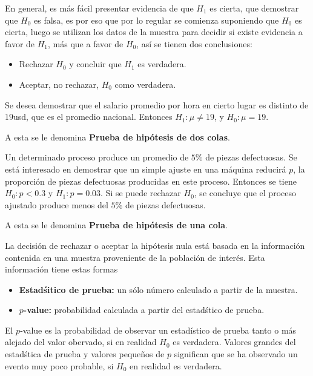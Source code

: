 En general, es m\'as f\'acil presentar evidencia de que $H_{1}$ es cierta, que demostrar 	que $H_{0}$ es falsa, es por eso que por lo regular se comienza suponiendo que $H_{0}$ es cierta, luego se utilizan los datos de la muestra para decidir si existe evidencia a favor de $H_{1}$, m\'as que a favor de $H_{0}$, as\'i se tienen dos conclusiones:
\begin{itemize}
\item Rechazar $H_{0}$ y concluir que $H_{1}$ es verdadera.
\item Aceptar, no rechazar, $H_{0}$ como verdadera.
\end{itemize}

\begin{Ejem}
Se desea demostrar que el salario promedio  por hora en cierto lugar es distinto de $19$usd, que es el promedio nacional. Entonces $H_{1}:\mu\neq19$, y $H_{0}:\mu=19$.
\end{Ejem}
A esta se le denomina \textbf{Prueba de hip\'otesis de dos colas}.

\begin{Ejem}
Un determinado proceso produce un promedio de $5\%$ de piezas defectuosas. Se est\'a interesado en demostrar que un simple ajuste en una m\'aquina reducir\'a $p$, la proporci\'on de piezas defectuosas producidas en este proceso. Entonces se tiene $H_{0}:p<0.3$ y $H_{1}:p=0.03$. Si se puede rechazar $H_{0}$, se concluye que el proceso ajustado produce menos del $5\%$ de piezas defectuosas.
\end{Ejem}
A esta se le denomina \textbf{Prueba de hip\'otesis de una cola}.

La decisi\'on de rechazar o aceptar la hip\'otesis nula est\'a basada en la informaci\'on contenida en una muestra proveniente de la poblaci\'on de inter\'es. Esta informaci\'on tiene estas formas

\begin{itemize}
\item \textbf{Estad\'sitico de prueba:} un s\'olo n\'umero calculado a partir de la muestra.

\item \textbf{$p$-value:} probabilidad calculada a partir del estad\'stico de prueba.
\end{itemize}

\begin{Def}
El $p$-value es la probabilidad de observar un estad\'istico de prueba tanto o m\'as alejado del valor obervado, si en realidad $H_{0}$ es verdadera.\medskip
Valores grandes del estad\'stica de prueba  y valores peque\~nos de $p$ significan que se ha observado un evento muy poco probable, si $H_{0}$ en realidad es verdadera.
\end{Def}

